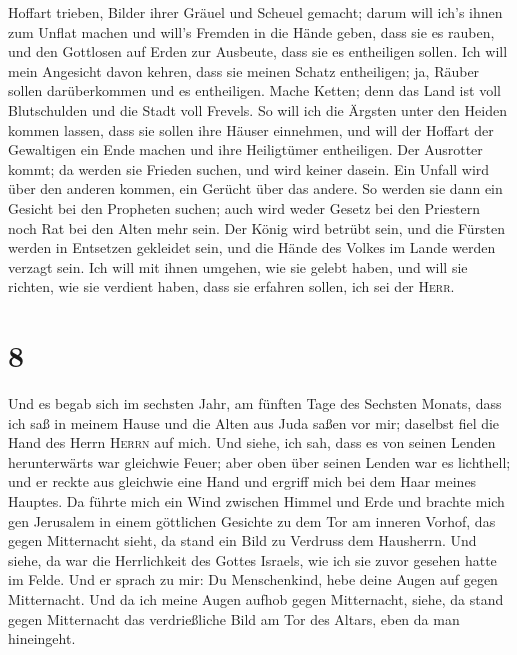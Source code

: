 Hoffart trieben, Bilder ihrer Gräuel und Scheuel gemacht; darum will
ich's ihnen zum Unflat machen  und will's Fremden in die
Hände geben, dass sie es rauben, und den Gottlosen auf Erden zur
Ausbeute, dass sie es entheiligen sollen.  Ich will mein
Angesicht davon kehren, dass sie meinen Schatz entheiligen; ja, Räuber
sollen darüberkommen und es entheiligen.  Mache Ketten;
denn das Land ist voll Blutschulden und die Stadt voll Frevels.
 So will ich die Ärgsten unter den Heiden kommen lassen,
dass sie sollen ihre Häuser einnehmen, und will der Hoffart der
Gewaltigen ein Ende machen und ihre Heiligtümer entheiligen.
 Der Ausrotter kommt; da werden sie Frieden suchen, und
wird keiner dasein.  Ein Unfall wird über den anderen
kommen, ein Gerücht über das andere. So werden sie dann ein Gesicht bei
den Propheten suchen; auch wird weder Gesetz bei den Priestern noch Rat
bei den Alten mehr sein.  Der König wird betrübt sein,
und die Fürsten werden in Entsetzen gekleidet sein, und die Hände des
Volkes im Lande werden verzagt sein. Ich will mit ihnen umgehen, wie sie
gelebt haben, und will sie richten, wie sie verdient haben, dass sie
erfahren sollen, ich sei der \textsc{Herr}.

\hypertarget{section-7}{%
\section{8}\label{section-7}}

 Und es begab sich im sechsten Jahr, am fünften Tage des
Sechsten Monats, dass ich saß in meinem Hause und die Alten aus Juda
saßen vor mir; daselbst fiel die Hand des Herrn \textsc{Herrn} auf mich.
 Und siehe, ich sah, dass es von seinen Lenden
herunterwärts war gleichwie Feuer; aber oben über seinen Lenden war es
lichthell;  und er reckte aus gleichwie eine Hand und
ergriff mich bei dem Haar meines Hauptes. Da führte mich ein Wind
zwischen Himmel und Erde und brachte mich gen Jerusalem in einem
göttlichen Gesichte zu dem Tor am inneren Vorhof, das gegen Mitternacht
sieht, da stand ein Bild zu Verdruss dem Hausherrn.  Und
siehe, da war die Herrlichkeit des Gottes Israels, wie ich sie zuvor
gesehen hatte im Felde.  Und er sprach zu mir: Du
Menschenkind, hebe deine Augen auf gegen Mitternacht. Und da ich meine
Augen aufhob gegen Mitternacht, siehe, da stand gegen Mitternacht das
verdrießliche Bild am Tor des Altars, eben da man hineingeht.

